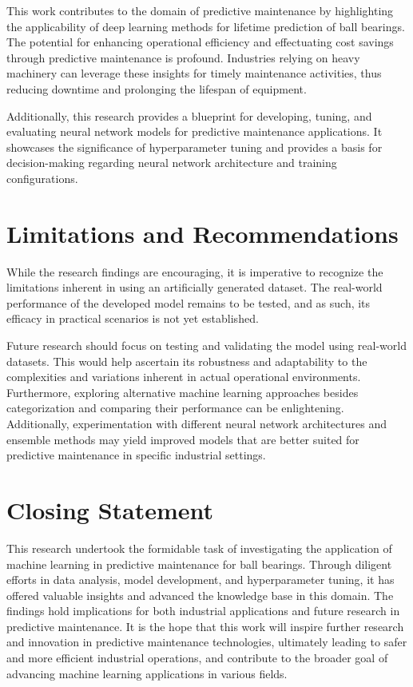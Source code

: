 This work contributes to the domain of predictive maintenance by highlighting the applicability of deep learning methods for lifetime prediction of ball bearings. The potential for enhancing operational efficiency and effectuating cost savings through predictive maintenance is profound. Industries relying on heavy machinery can leverage these insights for timely maintenance activities, thus reducing downtime and prolonging the lifespan of equipment.

Additionally, this research provides a blueprint for developing, tuning, and evaluating neural network models for predictive maintenance applications. It showcases the significance of hyperparameter tuning and provides a basis for decision-making regarding neural network architecture and training configurations.

\section{Limitations and Recommendations}
While the research findings are encouraging, it is imperative to recognize the limitations inherent in using an artificially generated dataset. The real-world performance of the developed model remains to be tested, and as such, its efficacy in practical scenarios is not yet established.

Future research should focus on testing and validating the model using real-world datasets. This would help ascertain its robustness and adaptability to the complexities and variations inherent in actual operational environments. Furthermore, exploring alternative machine learning approaches besides categorization and comparing their performance can be enlightening. Additionally, experimentation with different neural network architectures and ensemble methods may yield improved models that are better suited for predictive maintenance in specific industrial settings.

\section{Closing Statement}
This research undertook the formidable task of investigating the application of machine learning in predictive maintenance for ball bearings. Through diligent efforts in data analysis, model development, and hyperparameter tuning, it has offered valuable insights and advanced the knowledge base in this domain. The findings hold implications for both industrial applications and future research in predictive maintenance. It is the hope that this work will inspire further research and innovation in predictive maintenance technologies, ultimately leading to safer and more efficient industrial operations, and contribute to the broader goal of advancing machine learning applications in various fields.
